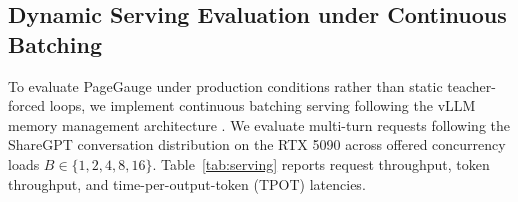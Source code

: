 \documentclass{article}
\begin{document}
\begin{table}[t]
\caption{Architectural execution paradigms and host dispatch analysis on RTX 5090.}
\label{tab:paradigms}
\centering\small
{}
\end{table}

\subsection{Dynamic Serving Evaluation under Continuous Batching}
To evaluate PageGauge under production conditions rather than static teacher-forced loops, we implement continuous batching serving following the vLLM memory management architecture \citep{kwon2023vllm,yu2022orca}. We evaluate multi-turn requests following the ShareGPT conversation distribution on the RTX 5090 across offered concurrency loads $B \in \{1, 2, 4, 8, 16\}$. Table~\ref{tab:serving} reports request throughput, token throughput, and time-per-output-token (TPOT) latencies.
\end{document}
